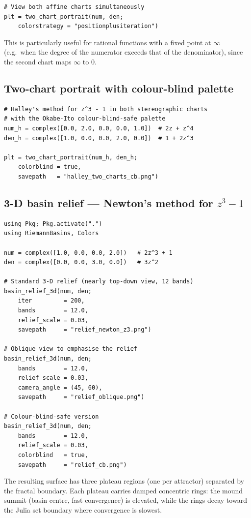 \documentclass[11pt,a4paper]{article}
\theoremstyle{definition}
\begin{document}
\begin{lstlisting}
# View both affine charts simultaneously
plt = two_chart_portrait(num, den;
    colorstrategy = "positionplusiteration")
\end{lstlisting}

This is particularly useful for rational functions with a fixed point at
$\infty$ (e.g.\ when the degree of the numerator exceeds that of the
denominator), since the second chart maps $\infty$ to $0$.

\subsection{Two-chart portrait with colour-blind palette}

\begin{lstlisting}
# Halley's method for z^3 - 1 in both stereographic charts
# with the Okabe-Ito colour-blind-safe palette
num_h = complex([0.0, 2.0, 0.0, 0.0, 1.0])  # 2z + z^4
den_h = complex([1.0, 0.0, 0.0, 2.0, 0.0])  # 1 + 2z^3

plt = two_chart_portrait(num_h, den_h;
    colorblind = true,
    savepath   = "halley_two_charts_cb.png")
\end{lstlisting}

\subsection{3-D basin relief — Newton's method for $z^3-1$}

\begin{lstlisting}
using Pkg; Pkg.activate(".")
using RiemannBasins, Colors

num = complex([1.0, 0.0, 0.0, 2.0])   # 2z^3 + 1
den = complex([0.0, 0.0, 3.0, 0.0])   # 3z^2

# Standard 3-D relief (nearly top-down view, 12 bands)
basin_relief_3d(num, den;
    iter         = 200,
    bands        = 12.0,
    relief_scale = 0.03,
    savepath     = "relief_newton_z3.png")

# Oblique view to emphasise the relief
basin_relief_3d(num, den;
    bands        = 12.0,
    relief_scale = 0.03,
    camera_angle = (45, 60),
    savepath     = "relief_oblique.png")

# Colour-blind-safe version
basin_relief_3d(num, den;
    bands        = 12.0,
    relief_scale = 0.03,
    colorblind   = true,
    savepath     = "relief_cb.png")
\end{lstlisting}

The resulting surface has three plateau regions (one per attractor) separated
by the fractal boundary.  Each plateau carries damped concentric rings:
the mound summit (basin centre, fast convergence) is elevated, while the
rings decay toward the Julia set boundary where convergence is slowest.
\end{document}
